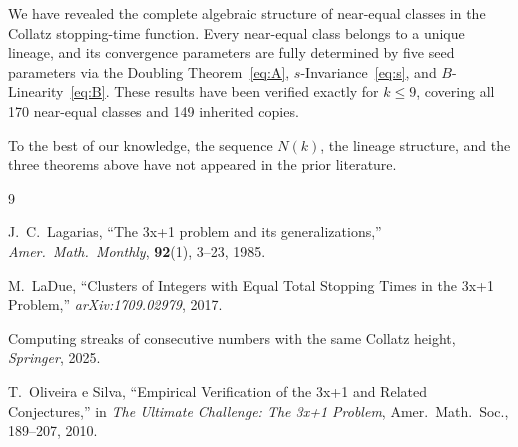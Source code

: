\documentclass[twocolumn,a4paper,10pt]{article}
\begin{document}
We have revealed the complete algebraic structure of near-equal classes
in the Collatz stopping-time function.
Every near-equal class belongs to a unique lineage, and its convergence
parameters are fully determined by five seed parameters via
the Doubling Theorem~\eqref{eq:A}, $s$-Invariance~\eqref{eq:s},
and $B$-Linearity~\eqref{eq:B}.
These results have been verified exactly for $k \leq 9$,
covering all 170 near-equal classes and 149 inherited copies.

To the best of our knowledge, the sequence $N(k)$,
the lineage structure, and the three theorems above
have not appeared in the prior literature.

\begin{thebibliography}{9}

J.~C.\ Lagarias,
``The 3x+1 problem and its generalizations,''
\textit{Amer.\ Math.\ Monthly}, \textbf{92}(1), 3--23, 1985.

M.~LaDue,
``Clusters of Integers with Equal Total Stopping Times
in the 3x+1 Problem,''
\textit{arXiv:1709.02979}, 2017.

Computing streaks of consecutive numbers with the same Collatz height,
\textit{Springer}, 2025.

T.~Oliveira e Silva,
``Empirical Verification of the 3x+1 and Related Conjectures,''
in \textit{The Ultimate Challenge: The 3x+1 Problem},
Amer.\ Math.\ Soc., 189--207, 2010.

\end{thebibliography}
\end{document}
